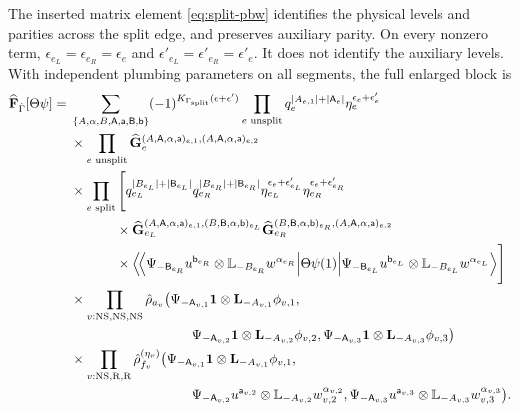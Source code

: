 \documentclass[11pt]{article}
\newcommand{\NS}{\mathrm{NS}}
\newcommand{\R}{\mathrm R}
\numberwithin{equation}{section}
\begin{document}
The inserted matrix element \eqref{eq:split-pbw} identifies the physical
levels and parities across the split edge, and preserves auxiliary
parity. On every nonzero term,
$\epsilon_{e_L}=\epsilon_{e_R}=\epsilon_e$ and
$\epsilon'_{e_L}=\epsilon'_{e_R}=\epsilon'_e$.
It does not identify the auxiliary levels. With independent plumbing
parameters on all segments, the full enlarged block is
\begin{align}
 \widehat{\mathbf F}_{\hat\Gamma}[\Theta\psi]
 ={}&\sum_{\{A,\alpha,B,\mathsf A,\mathsf a,\mathsf B,\mathsf b\}}
       (-1)^{K_{\Gamma_{\mathrm{split}}}(\epsilon+\epsilon')}
 \prod_{e\text{ unsplit}}
       q_e^{|A_{e,1}|+|\mathsf A_e|}
       \eta_e^{\epsilon_e+\epsilon'_e}
 \nonumber\\
 &\times\prod_{e\text{ unsplit}}
       \widehat{\mathbf G}_e^{
       (A,\mathsf A,\alpha,\mathsf a)_{e,1},
       (A,\mathsf A,\alpha,\mathsf a)_{e,2}}
 \nonumber\\
 &\times\prod_{e\text{ split}}\Bigg[
       q_{e_L}^{|B_{e_L}|+|\mathsf B_{e_L}|}
       q_{e_R}^{|B_{e_R}|+|\mathsf B_{e_R}|}
       \eta_{e_L}^{\epsilon_e+\epsilon'_{e_L}}
       \eta_{e_R}^{\epsilon_e+\epsilon'_{e_R}}
 \nonumber\\
 &\hspace{12mm}\times
       \widehat{\mathbf G}_{e_L}^{
       (A,\mathsf A,\alpha,\mathsf a)_{e,1},
       (B,\mathsf B,\alpha,\mathsf b)_{e_L}}
       \widehat{\mathbf G}_{e_R}^{
       (B,\mathsf B,\alpha,\mathsf b)_{e_R},
       (A,\mathsf A,\alpha,\mathsf a)_{e,2}}
 \nonumber\\
 &\hspace{12mm}\times
 \Big\langle\!\Big\langle
       \Psi_{-\mathsf B_{e_R}}u^{\mathsf b_{e_R}}
                    \otimes\mathbb L_{-B_{e_R}}w^{\alpha_{e_R}}
 \Big|\Theta\psi(1)\Big|
       \Psi_{-\mathsf B_{e_L}}u^{\mathsf b_{e_L}}
                    \otimes\mathbb L_{-B_{e_L}}w^{\alpha_{e_L}}
 \Big\rangle\Bigg]
 \nonumber\\
 &\times\prod_{v:\NS,\NS,\NS}\hat\rho_{a_v}\bigl(
       \Psi_{-\mathsf A_{v,1}}\mathbf1\otimes
                    \mathbf L_{-A_{v,1}}\phi_{v,1},
 \nonumber\\
 &\hspace{32mm}
       \Psi_{-\mathsf A_{v,2}}\mathbf1\otimes
                    \mathbf L_{-A_{v,2}}\phi_{v,2},
       \Psi_{-\mathsf A_{v,3}}\mathbf1\otimes
                    \mathbf L_{-A_{v,3}}\phi_{v,3}\bigr)
 \nonumber\\
 &\times\prod_{v:\NS,\R,\R}\hat\rho_{f_v}^{(\eta_v)}\bigl(
       \Psi_{-\mathsf A_{v,1}}\mathbf1\otimes
                    \mathbf L_{-A_{v,1}}\phi_{v,1},
 \nonumber\\
 &\hspace{32mm}
       \Psi_{-\mathsf A_{v,2}}u^{\mathsf a_{v,2}}\otimes
                    \mathbb L_{-A_{v,2}}w_{v,2}^{\alpha_{v,2}},
       \Psi_{-\mathsf A_{v,3}}u^{\mathsf a_{v,3}}\otimes
                    \mathbb L_{-A_{v,3}}w_{v,3}^{\alpha_{v,3}}\bigr).
 \label{eq:split-enlarged-block}
\end{align}
\end{document}
